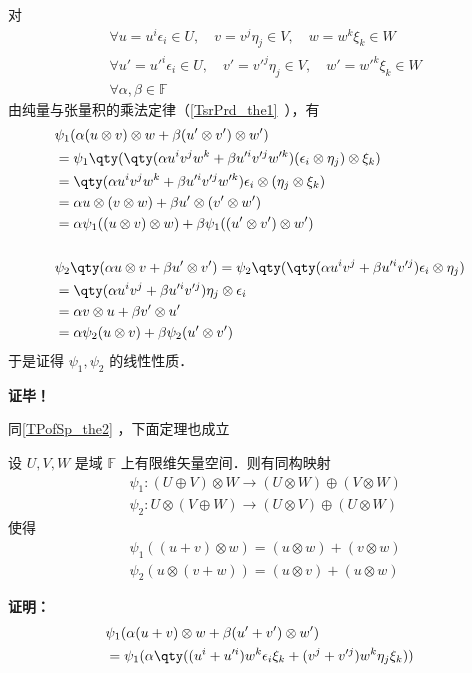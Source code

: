 对
\begin{equation}
\begin{aligned}
&\forall u=u^i\epsilon_i\in U,\quad v=v^j\eta_j\in V,\quad w=w^k\xi_k\in W\\
&\forall u'=u'^i\epsilon_i\in U,\quad v'=v'^j\eta_j\in V,\quad w'=w'^k\xi_k\in W\\
&\forall \alpha,\beta \in\mathbb F
\end{aligned}
\end{equation}
由纯量与张量积的乘法定律（\autoref{TsrPrd_the1}~），有
\begin{equation}
\begin{aligned}
&\psi_1(\alpha(u\otimes v)\otimes w+\beta(u'\otimes v')\otimes w')\\
&=\psi_1\qty(\qty(\alpha u^iv^jw^k+\beta u'^iv'^jw'^k)(\epsilon_i\otimes\eta_j)\otimes\xi_k)\\
&=\qty(\alpha u^iv^jw^k+\beta u'^iv'^jw'^k)\epsilon_i\otimes(\eta_j\otimes\xi_k)\\
&=\alpha u\otimes (v\otimes w)+\beta u'\otimes (v'\otimes w')\\
&=\alpha\psi_1((u\otimes v)\otimes w)+\beta\psi_1((u'\otimes v')\otimes w')\\
\\
&\psi_2\qty(\alpha u\otimes v+\beta u'\otimes v')=\psi_2\qty(\qty(\alpha u^iv^j+\beta u'^iv'^j)\epsilon_i\otimes\eta_j)\\
&=\qty(\alpha u^iv^j+\beta u'^iv'^j)\eta_j\otimes\epsilon_i\\
&=\alpha v\otimes u+\beta v'\otimes u'\\
&=\alpha\psi_2(u\otimes v)+\beta\psi_2(u'\otimes v')
\end{aligned}
\end{equation}
于是证得  $\psi_1,\psi_2$ 的线性性质．

\textbf{证毕！}

同\autoref{TPofSp_the2} ，下面定理也成立
\begin{theorem}{}
设 $U,V,W$ 是域 $\mathbb F$ 上有限维矢量空间．则有同构映射
\begin{equation}
\begin{aligned}
&\psi_1:(U\oplus V)\otimes W\rightarrow (U\otimes W)\oplus (V\otimes W) \\
&\psi_2:U\otimes(V\oplus W)\rightarrow (U\otimes V)\oplus (U\otimes W)
\end{aligned}
\end{equation}
使得
\begin{equation}
\begin{aligned}
&\psi_1((u+v)\otimes w)=(u\otimes w)+ (v\otimes w)\\
&\psi_2(u\otimes (v+ w))=(u\otimes v)+ (u\otimes w) 
\end{aligned}
\end{equation}
\end{theorem}
\textbf{证明：}
\begin{equation}
\begin{aligned}
&\psi_1(\alpha(u+v)\otimes w+\beta(u'+v')\otimes w')\\
&=\psi_1(\alpha\qty((u^i+u'^i)w^k\epsilon_i\xi_k+(v^j+v'^j)w^k\eta_j\xi_k))
\end{aligned}
\end{equation}
